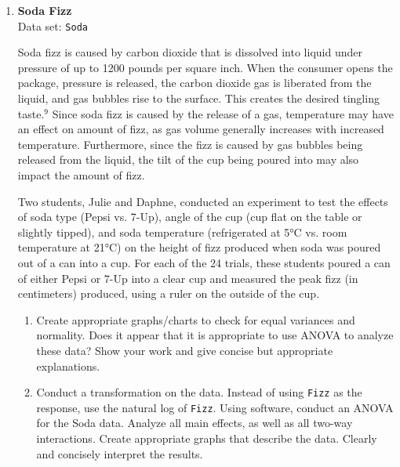 \documentclass[
]{report}
\begin{document}
\begin{enumerate}
  \begin{enumerate}
    \item Make the assumption that ANOVA is appropriate for the data (i.e., do not transform any data). Using software, conduct an ANOVA for the data that will analyze all main effects, as well as all two-way interactions. Treat the six buildings as six levels of the \textit{Building} factor. Treat faucet, desk, and door as three levels of the \textit{Location} factor.
    \item Create appropriate graphs/charts to check for equal variances and normality. Does it appear that it is appropriate to use ANOVA to analyze these data?
    \item Transform the response to the natural log of \texttt{Count} and redo the analysis. How do the results change? Create appropriate graphs to display the main effects and the interaction effects. Describe how the academic buildings (ARH and Noyce) compare to the other buildings.
  \end{enumerate}

  \item \textbf{Soda Fizz}\\
  Data set: \texttt{Soda}

Soda fizz is caused by carbon dioxide that is dissolved into liquid under pressure of up to 1200 pounds per square inch. When the consumer opens the package, pressure is released, the carbon dioxide gas is liberated from the liquid, and gas bubbles rise to the surface. This creates the desired tingling taste.$^9$ Since soda fizz is caused by the release of a gas, temperature may have an effect on amount of fizz, as gas volume generally increases with increased temperature. Furthermore, since the fizz is caused by gas bubbles being released from the liquid, the tilt of the cup being poured into may also impact the amount of fizz.

Two students, Julie and Daphne, conducted an experiment to test the effects of soda type (Pepsi vs. 7-Up), angle of the cup (cup flat on the table or slightly tipped), and soda temperature (refrigerated at 5°C vs. room temperature at 21°C) on the height of fizz produced when soda was poured out of a can into a cup. For each of the 24 trials, these students poured a can of either Pepsi or 7-Up into a clear cup and measured the peak fizz (in centimeters) produced, using a ruler on the outside of the cup.

  \begin{enumerate}
    \item Create appropriate graphs/charts to check for equal variances and normality. Does it appear that it is appropriate to use ANOVA to analyze these data? Show your work and give concise but appropriate explanations.
    \item Conduct a transformation on the data. Instead of using \texttt{Fizz} as the response, use the natural log of \texttt{Fizz}. Using software, conduct an ANOVA for the Soda data. Analyze all main effects, as well as all two-way interactions. Create appropriate graphs that describe the data. Clearly and concisely interpret the results.
  \end{enumerate}


\end{enumerate}
\end{document}

